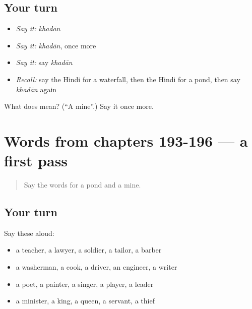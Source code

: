 \subsection*{Your turn}
\begin{itemize}
\raggedright
  \item \emph{Say it:} \emph{khadān}
  \item \emph{Say it:} \emph{khadān}, once more
  \item \emph{Say it:} say \emph{khadān}
  \item \emph{Recall:} say the Hindi for a waterfall, then the Hindi for a pond, then say \emph{khadān} again
\end{itemize}

\begin{tcolorbox}[breakable,colback=teal!4,colframe=teal!35!black,title={Before you move on}]
What does  mean? (\textquotedblleft{}A mine\textquotedblright{}.) Say it once more.
\end{tcolorbox}
\section[(dialogue)]{Words from chapters 193-196 — a first pass}

\label{lesson:HI-R201-first-pass-words-from-chapters-193-196}



\begin{quote}
Say the words for a pond and a mine.
\end{quote}

\subsection*{Your turn}
Say these aloud:

\begin{itemize}
\raggedright
  \item a teacher, a lawyer, a soldier, a tailor, a barber
  \item a washerman, a cook, a driver, an engineer, a writer
  \item a poet, a painter, a singer, a player, a leader
  \item a minister, a king, a queen, a servant, a thief
\end{itemize}

